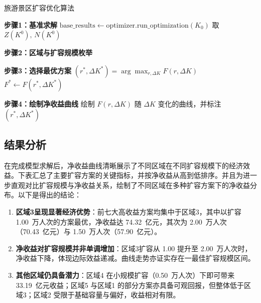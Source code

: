 \begin{algorithm}[H]\small
  \renewcommand{\algorithmcfname}{算法}
  \caption{旅游景区扩容优化算法}


  \textbf{步骤1：基准求解}\;
  $\text{base\_results}\leftarrow\text{optimizer.run\_optimization}(K_0)$\;
  取 $Z(K^0),\,N(K^0)$\;

  \textbf{步骤2：区域与扩容规模枚举}\;

  \textbf{步骤3：选择最优方案}\;
  $(r^*,\Delta K^*) = \arg\max_{r,\Delta K} F(r,\Delta K)$\;
  $F^* \leftarrow F(r^*,\Delta K^*)$\;

  \textbf{步骤4：绘制净收益曲线}\;
  绘制 $F(r,\Delta K)$ 随 $\Delta K$ 变化的曲线，并标注 $(r^*,\Delta K^*)$\;

  \label{algorithm:expansion_optimization}
\end{algorithm}

\subsection[\hspace{-2pt}结果分析]{{\heiti{}\hspace{-8pt}结果分析}}\label{subsec:3-model-build}
在完成模型求解后，净收益曲线清晰展示了不同区域在不同扩容规模下的经济效益。下表汇总了主要扩容方案的关键指标，并按净收益从高到低排序。并且为进一步直观对比扩容规模与净收益关系，绘制了不同区域在多种扩容方案下的净收益分布。以下是得出的结论：
\begin{enumerate}
  \item \textbf{区域3呈现显著经济优势}：前七大高收益方案均集中于区域3，其中以扩容 1.00~万人次的方案最优，净收益达 74.32~亿元，其次为 2.00~万人次（70.43~亿元）与 1.50~万人次（57.90~亿元）。
  \item \textbf{净收益对扩容规模并非单调增加}：区域3扩容从 1.00 提升至 2.00~万人次时，净收益下降，体现边际效益递减。曲线走势亦证实存在一最佳扩容规模区间。
  \item \textbf{其他区域仍具备潜力}：区域4 在小规模扩容（0.50~万人次）下即可带来 33.19~亿元收益；区域5 与区域1 的部分方案亦具备可观回报，但整体低于区域3；区域2 受限于基础容量与偏好，收益相对有限。
\end{enumerate}

